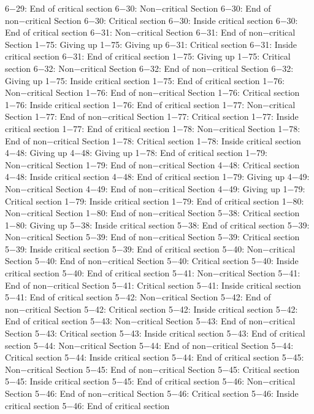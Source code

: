6−29: End of critical section
6−30: Non−critical Section
6−30: End of non−critical Section
6−30: Critical section
6−30: Inside critical section
6−30: End of critical section
6−31: Non−critical Section
6−31: End of non−critical Section
1−75: Giving up
1−75: Giving up
6−31: Critical section
6−31: Inside critical section
6−31: End of critical section
1−75: Giving up
1−75: Critical section
6−32: Non−critical Section
6−32: End of non−critical Section
6−32: Giving up
1−75: Inside critical section
1−75: End of critical section
1−76: Non−critical Section
1−76: End of non−critical Section
1−76: Critical section
1−76: Inside critical section
1−76: End of critical section
1−77: Non−critical Section
1−77: End of non−critical Section
1−77: Critical section
1−77: Inside critical section
1−77: End of critical section
1−78: Non−critical Section
1−78: End of non−critical Section
1−78: Critical section
1−78: Inside critical section
4−48: Giving up
4−48: Giving up
1−78: End of critical section
1−79: Non−critical Section
1−79: End of non−critical Section
4−48: Critical section
4−48: Inside critical section
4−48: End of critical section
1−79: Giving up
4−49: Non−critical Section
4−49: End of non−critical Section
4−49: Giving up
1−79: Critical section
1−79: Inside critical section
1−79: End of critical section
1−80: Non−critical Section
1−80: End of non−critical Section
5−38: Critical section
1−80: Giving up
5−38: Inside critical section
5−38: End of critical section
5−39: Non−critical Section
5−39: End of non−critical Section
5−39: Critical section
5−39: Inside critical section
5−39: End of critical section
5−40: Non−critical Section
5−40: End of non−critical Section
5−40: Critical section
5−40: Inside critical section
5−40: End of critical section
5−41: Non−critical Section
5−41: End of non−critical Section
5−41: Critical section
5−41: Inside critical section
5−41: End of critical section
5−42: Non−critical Section
5−42: End of non−critical Section
5−42: Critical section
5−42: Inside critical section
5−42: End of critical section
5−43: Non−critical Section
5−43: End of non−critical Section
5−43: Critical section
5−43: Inside critical section
5−43: End of critical section
5−44: Non−critical Section
5−44: End of non−critical Section
5−44: Critical section
5−44: Inside critical section
5−44: End of critical section
5−45: Non−critical Section
5−45: End of non−critical Section
5−45: Critical section
5−45: Inside critical section
5−45: End of critical section
5−46: Non−critical Section
5−46: End of non−critical Section
5−46: Critical section
5−46: Inside critical section
5−46: End of critical section
